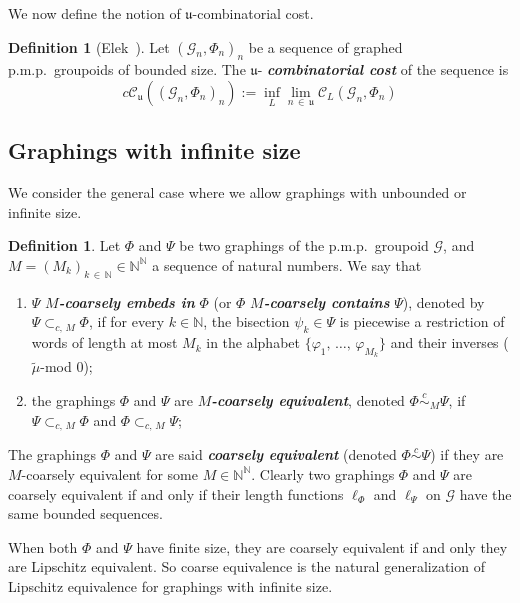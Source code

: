 \documentclass[10pt]{amsart}
\theoremstyle{definition}
\newtheorem{defi}[cdrthm]{Definition}
\newcommand{\defin}[1]{\textbf{\emph{#1}}}
\newcommand{\Nmath}{\mathbb{N}}
\newcommand{\cost}{\mathcal{C}}
\newcommand{\ccost}{c\mathcal{C}}
\newcommand{\cg}{\mathcal{G}}
\newcommand{\ul}{\mathfrak{u}}
\newcommand{\ph}{\varphi}
\newcommand{\pmp}{p.m.p.\ }
\newcommand\ceq{\overset{c}{\sim}}
\begin{document}
\medskip
We now define the notion of $\ul$-combinatorial cost.
\begin{defi}[Elek~\cite{Elek-combinatorial-cost-2007}]\label{def: ul-comb-cost}
Let $(\cg_n,\Phi_n)_n$ be a sequence of graphed \pmp groupoids of bounded size. The $\ul$-
\defin{combinatorial cost} of the sequence is
\begin{equation}
\ccost_\ul\left(\left(\cg_n,\Phi_n\right)_n\right):=\inf_L\lim_{n\,\in\,\ul}\cost_L\left(\cg_n,\Phi_n\right)
\end{equation}
\end{defi}

\subsection{Graphings with infinite size}\label{subsection:infinite_graphings}
We consider the general case where we allow graphings with unbounded or infinite size.

\begin{defi}\label{def:Coarsely-contain-equiv-graphins}
Let $\Phi$ and $\Psi$ be two graphings of the \pmp groupoid $\cg$, and $M=(M_k)_{k\,\in\,\Nmath} \in \Nmath^\Nmath$ a sequence of natural numbers. We say that
\begin{enumerate}
\item \label{defi3.8.1}$\Psi$ \defin{$M$-coarsely embeds in} $\Phi$ (or $\Phi$ \defin{$M$-coarsely contains} $\Psi$), denoted by $\Psi\subset_{c,\,M} \Phi$, if for every $k\in\Nmath$, the bisection $\psi_k\in\Psi$ is piecewise a restriction of words of length at most $M_k$ in the alphabet $\{\ph_1,\,\ldots,\,\ph_{M_k}\}$ and their inverses ($\widetilde{\mu}$-mod $0$);
\item \label{defi3.8.2}the graphings $\Phi$ and $\Psi$ are \defin{$M$-coarsely equivalent}, denoted $\Phi\ceq_M\Psi$, if $\Psi\subset_{c,\,M} \Phi$ and $\Phi \subset_{c,\,M} \Psi$;
\end{enumerate}
\end{defi}

The graphings $\Phi$ and $\Psi$ are said
\defin{coarsely equivalent} (denoted $\Phi\ceq\Psi$) if they are $M$-coarsely equivalent for some $M \in \Nmath^\Nmath$. Clearly two graphings $\Phi$ and $\Psi$ are coarsely equivalent if and only if their length functions $\ell_\Phi$ and $\ell_\Psi$ on $\cg$ have the same bounded sequences.

When both $\Phi$ and $\Psi$ have finite size, they are coarsely equivalent if and only they are Lipschitz equivalent. So coarse equivalence is the natural generalization of Lipschitz equivalence for graphings with infinite size.
\end{document}
